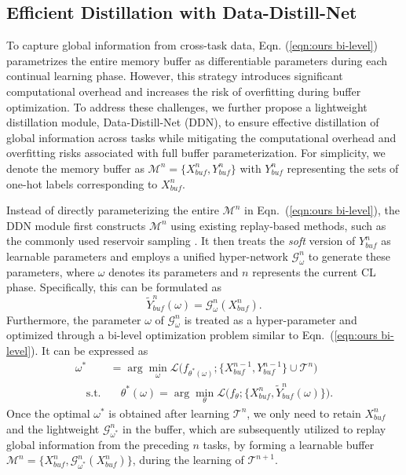 \documentclass[table, xcdraw]{article}
\theoremstyle{plain}
\theoremstyle{definition}
\theoremstyle{remark}
\begin{document}
\subsection{Efficient Distillation with Data-Distill-Net}
\label{subsec:ddn}
To capture global information from cross-task data, Eqn. (\ref{eqn:ours bi-level}) parametrizes the entire memory buffer as differentiable parameters during each continual learning phase. However, this strategy introduces significant computational overhead and increases the risk of overfitting during buffer optimization.
To address these challenges, we further propose a lightweight distillation module, Data-Distill-Net (DDN), to ensure effective distillation of global information across tasks while mitigating the computational overhead and overfitting risks associated with full buffer parameterization. For simplicity, we denote the memory buffer as $\mathcal M^{n}=\{X_{buf}^n,Y_{buf}^n\}$ with $Y_{buf}^n$ representing the sets of one-hot labels corresponding to $X_{buf}^n$.


Instead of directly parameterizing the entire $\mathcal{M}^n$ in Eqn.~(\ref{eqn:ours bi-level}), the DDN module first constructs $\mathcal{M}^n$ using existing replay-based methods, such as the commonly used reservoir sampling \cite{Reservoirsamplingvitter1985random}. It then treats the \textit{soft} version of $Y^n_{buf}$ as learnable parameters and employs a unified hyper-network $\mathcal{G}_\omega^n$ to generate these parameters, where $\omega$ denotes its parameters and \(n\) represents the current CL phase. Specifically, this can be formulated as
\begin{equation}
    \tilde{Y}^n_{buf}(\omega) = \mathcal G^n_\omega(X^n_{buf}).
    \label{soft-labels}
\end{equation}
Furthermore, the parameter $\omega$ of $\mathcal{G}_{\omega}^n$ is treated as a hyper-parameter and optimized through a bi-level optimization problem similar to Eqn.~(\ref{eqn:ours bi-level}). It can be expressed as
\begin{equation}
\begin{aligned} 
\omega^*  &= \arg\min_{\omega} \mathcal{L}\bigl(f_{\theta^*(\omega)};\{X_{buf}^{n-1},Y_{buf}^{n-1}\} \cup\mathcal{T}^n\bigr) \\
\quad  \text{s.t.} & \quad\theta^*(\omega) = \arg\min_{\theta} \mathcal{L}\bigl(f_\theta; \{X^n_{buf},\tilde{Y}^n_{buf}(\omega)\}\bigr).
\label{eqn:ddn}
\end{aligned}
\end{equation}
Once the optimal $\omega^*$ is obtained after learning $\mathcal{T}^n$, we only need to retain $X_{buf}^n$ and the lightweight $\mathcal{G}_{\omega^*}^n$ in the buffer, which are subsequently utilized to replay global information from the preceding $n$ tasks, by forming a learnable buffer $\mathcal M^n=\bigl\{{X_{buf}^n, \mathcal G_{\omega^*}^n(X_{buf}^n)}\bigr\}$, during the learning of $\mathcal{T}^{n+1}$.
\end{document}
